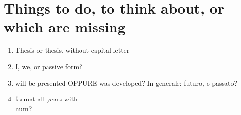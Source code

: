 
\chapter{Things to do, to think about, or which are missing}
\begin{enumerate}
\item Thesis or thesis, without capital letter
\item I, we, or passive form?
\item will be presented OPPURE was developed? In generale: futuro, o passato?
\item format all years with \\num?
\end{enumerate}